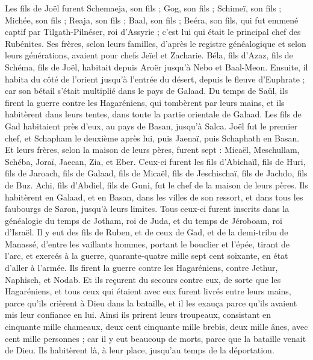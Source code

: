 \begin{multicols}{2}
Les fils de Joël furent Schemaeja, son fils ; Gog, son fils ; Schimeï, son fils ;
Michée, son fils ; Reaja, son fils ; Baal, son fils ;
Beéra, son fils, qui fut emmené captif par Tilgath-Pilnéser, roi d'Assyrie ; c'est lui qui était le principal chef des Rubénites.
Ses frères, selon leurs familles, d'après le registre généalogique et selon leurs générations, avaient pour chefs Jeïel et Zacharie.
Béla, fils d'Azaz, fils de Schéma, fils de Joël, habitait depuis Aroër jusqu'à Nebo et Baal-Meon.
Ensuite, il habita du côté de l'orient jusqu'à l'entrée du désert, depuis le fleuve d'Euphrate ; car son bétail s'était multiplié dans le pays de Galaad.
Du temps de Saül, ils firent la guerre contre les Hagaréniens, qui tombèrent par leurs mains, et ils habitèrent dans leurs tentes, dans toute la partie orientale de Galaad.
Les fils de Gad habitaient près d'eux, au pays de Basan, jusqu'à Salca.
Joël fut le premier chef, et Schapham le deuxième après lui, puis Jaenaï, puis Schaphath en Basan.
Et leurs frères, selon la maison de leurs pères, furent sept : Micaël, Meschullam, Schéba, Joraï, Jaecan, Zia, et Eber.
Ceux-ci furent les fils d'Abichaïl, fils de Huri, fils de Jaroach, fils de Galaad, fils de Micaël, fils de Jeschischaï, fils de Jachdo, fils de Buz.
Achi, fils d'Abdiel, fils de Guni, fut le chef de la maison de leurs pères.
Ils habitèrent en Galaad, et en Basan, dans les villes de son ressort, et dans tous les faubourgs de Saron, jusqu'à leurs limites.
Tous ceux-ci furent inscrits dans la généalogie du temps de Jotham, roi de Juda, et du temps de Jéroboam, roi d'Israël.
Il y eut des fils de Ruben, et de ceux de Gad, et de la demi-tribu de Manassé, d'entre les vaillants hommes, portant le bouclier et l'épée, tirant de l'arc, et exercés à la guerre, quarante-quatre mille sept cent soixante, en état d'aller à l'armée.
Ils firent la guerre contre les Hagaréniens, contre Jethur, Naphisch, et Nodab.
Et ils reçurent du secours contre eux, de sorte que les Hagaréniens, et tous ceux qui étaient avec eux furent livrés entre leurs mains, parce qu'ils crièrent à Dieu dans la bataille, et il les exauça parce qu'ils avaient mis leur confiance en lui.
Ainsi ils prirent leurs troupeaux, consistant en cinquante mille chameaux, deux cent cinquante mille brebis, deux mille ânes, avec cent mille personnes ;
car il y eut beaucoup de morts, parce que la bataille venait de Dieu. Ils habitèrent là, à leur place, jusqu'au temps de la déportation.

\end{multicols}
